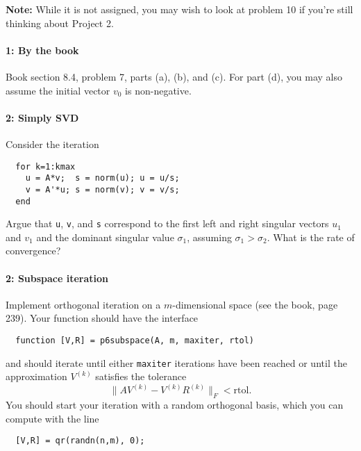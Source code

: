 \documentclass[12pt, leqno]{article}
\begin{document}

{\bf Note:} While it is not assigned, you may wish to look at problem
10 if you're still thinking about Project 2.

\paragraph*{1: By the book}
Book section 8.4, problem 7, parts (a), (b), and (c).  For part (d),
you may also assume the initial vector $v_0$ is non-negative.

\paragraph*{2: Simply SVD}
Consider the iteration
\begin{lstlisting}
  for k=1:kmax
    u = A*v;  s = norm(u); u = u/s;
    v = A'*u; s = norm(v); v = v/s;
  end
\end{lstlisting}
Argue that {\tt u}, {\tt v}, and {\tt s} correspond to the first left
and right singular vectors $u_1$ and $v_1$ and the dominant singular
value $\sigma_1$, assuming $\sigma_1 > \sigma_2$.  What is the rate
of convergence?

\paragraph*{2: Subspace iteration}
Implement orthogonal iteration on a $m$-dimensional space
(see the book, page 239).  Your function should have the interface
\begin{lstlisting}
  function [V,R] = p6subspace(A, m, maxiter, rtol)
\end{lstlisting}
and should iterate until either {\tt maxiter} iterations have been
reached or until the approximation $V^{(k)}$ satisfies the tolerance
\[
  \|A V^{(k)} - V^{(k)} R^{(k)}\|_F < \mbox{rtol}.
\]
You should start your iteration with a random orthogonal basis, which
you can compute with the line
\begin{lstlisting}
  [V,R] = qr(randn(n,m), 0);
\end{lstlisting}
\end{document}
